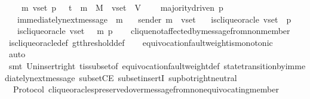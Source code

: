\begin{isabellebody}
\ \ {\isachardoublequoteopen}{\isasymforall}\ {\isasymsigma}\ m\ v{\isacharunderscore}set\ p{\isachardot}\ {\isasymsigma}\ {\isasymin}\ {\isasymSigma}t\ {\isasymand}\ m\ {\isasymin}\ M\ {\isasymand}\ v{\isacharunderscore}set\ {\isasymsubseteq}\ V\ \isanewline
\ \ {\isasymlongrightarrow}\ majority{\isacharunderscore}driven\ p\isanewline
\ \ {\isasymlongrightarrow}\ immediately{\isacharunderscore}next{\isacharunderscore}message\ {\isacharparenleft}{\isasymsigma}{\isacharcomma}\ m{\isacharparenright}\isanewline
\ \ {\isasymlongrightarrow}\ sender\ m\ {\isasymnotin}\ v{\isacharunderscore}set\isanewline
\ \ {\isasymlongrightarrow}\ is{\isacharunderscore}clique{\isacharunderscore}oracle\ {\isacharparenleft}v{\isacharunderscore}set{\isacharcomma}\ {\isasymsigma}{\isacharcomma}\ p{\isacharparenright}\ \isanewline
\ \ {\isasymlongrightarrow}\ is{\isacharunderscore}clique{\isacharunderscore}oracle\ {\isacharparenleft}v{\isacharunderscore}set{\isacharcomma}\ {\isasymsigma}\ {\isasymunion}\ {\isacharbraceleft}m{\isacharbraceright}{\isacharcomma}\ p{\isacharparenright}{\isachardoublequoteclose}\isanewline
%
\isadelimproof
\ \ %
\endisadelimproof
%
\isatagproof
{}\isamarkupfalse%
\ clique{\isacharunderscore}not{\isacharunderscore}affected{\isacharunderscore}by{\isacharunderscore}message{\isacharunderscore}from{\isacharunderscore}non{\isacharunderscore}member\isanewline
\ \ \isamarkupfalse%
\ is{\isacharunderscore}clique{\isacharunderscore}oracle{\isacharunderscore}def\ gt{\isacharunderscore}threshold{\isacharunderscore}def\isanewline
\ \ \isamarkupfalse%
\ equivocation{\isacharunderscore}fault{\isacharunderscore}weight{\isacharunderscore}is{\isacharunderscore}monotonic\isanewline
\ \ \isamarkupfalse%
\ auto\isanewline
\ \ \isamarkupfalse%
\ {\isacharparenleft}smt\ Un{\isacharunderscore}insert{\isacharunderscore}right\ {\isasymSigma}t{\isacharunderscore}is{\isacharunderscore}subset{\isacharunderscore}of{\isacharunderscore}{\isasymSigma}\ equivocation{\isacharunderscore}fault{\isacharunderscore}weight{\isacharunderscore}def\ state{\isacharunderscore}transition{\isacharunderscore}by{\isacharunderscore}immediately{\isacharunderscore}next{\isacharunderscore}message\ subsetCE\ subset{\isacharunderscore}insertI\ sup{\isacharunderscore}bot{\isachardot}right{\isacharunderscore}neutral{\isacharparenright}%
\endisatagproof
{\isafoldproof}%
%
\isadelimproof
\ \isanewline
%
\endisadelimproof
\isanewline
\isanewline
{}\isamarkupfalse%
\ {\isacharparenleft}\ Protocol{\isacharparenright}\ clique{\isacharunderscore}oracles{\isacharunderscore}preserved{\isacharunderscore}over{\isacharunderscore}message{\isacharunderscore}from{\isacharunderscore}non{\isacharunderscore}equivocating{\isacharunderscore}member\ {\isacharcolon}\isanewline

\end{isabellebody}
